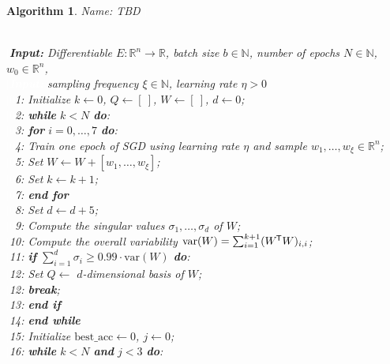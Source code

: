 \documentclass[11pt, a4paper]{article}
\newtheorem{algorithm}[theorem]{Algorithm}
\newcommand{\N}{\mathbb{N}}
\newcommand{\R}{\mathbb{R}}
\newcommand*{\tr}{^{\mkern-1.5mu\mathsf{T}}}
\begin{document}
\begin{algorithm}
\caption{Name: TBD \textcolor{white}{$\Big |$}} \ \\
\textcolor{white}{$\Big |$}\textbf{Input:} Differentiable $E: \R^n \to \R$, batch size $b \in \N$, number of epochs $N \in \N$, $w_0 \in \R^n$, \\
\textcolor{white}{$\Big |$\textbf{Input:}} sampling frequency $\xi \in \N$, learning rate $\eta > 0$ \\
\textcolor{white}{$\Big |0$}1: Initialize $k \leftarrow 0$, $Q \leftarrow [ \ ]$, $W \leftarrow [ \ ]$, $d \leftarrow 0$; \\
\textcolor{white}{$\Big |0$}2: \textbf{while} $k<N$ \textbf{do}: \\
\textcolor{white}{$\Big |0$}3: \quad \textbf{for} $i=0, \dots, 7$ \textbf{do}: \\
\textcolor{white}{$\Big |0$}4: \quad \quad Train one epoch of SGD using learning rate $\eta$ and sample $w_1, \dots, w_\xi \in \R^n$; \\
\textcolor{white}{$\Big |0$}5: \quad \quad Set $W \leftarrow W + [w_1, \dots, w_\xi]$; \\
\textcolor{white}{$\Big |0$}6: \quad \quad Set $k \leftarrow k+1$; \\
\textcolor{white}{$\Big |0$}7: \quad \textbf{end for} \\
\textcolor{white}{$\Big |0$}8: \quad Set $d \leftarrow d+5$; \\
\textcolor{white}{$\Big |0$}9: \quad Compute the singular values $\sigma_1, \dots, \sigma_d$ of $W$; \\
\textcolor{white}{$\Big |$}10: \quad Compute the overall variability $\text{var}(W) = \sum_{i=1}^{k+1} (W\tr W)_{i,i}$; \\
\textcolor{white}{$\Big |$}11: \quad \textbf{if} $\sum_{i=1}^{d} \sigma_i \geq 0.99 \cdot \text{var}(W)$ \textbf{do}: \\
\textcolor{white}{$\Big |$}12: \quad Set $Q \leftarrow$ $d$-dimensional basis of $W$; \\
\textcolor{white}{$\Big |$}12: \quad \quad \textbf{break}; \\
\textcolor{white}{$\Big |$}13: \quad \textbf{end if} \\
\textcolor{white}{$\Big |$}14: \textbf{end while} \\
\textcolor{white}{$\Big |$}15: Initialize $\text{best\_acc} \leftarrow 0$, $j \leftarrow 0$; \\
\textcolor{white}{$\Big |$}16: \textbf{while} $k<N$ \textbf{and} $j<3$ \textbf{do}: \\

\end{algorithm}
\end{document}
